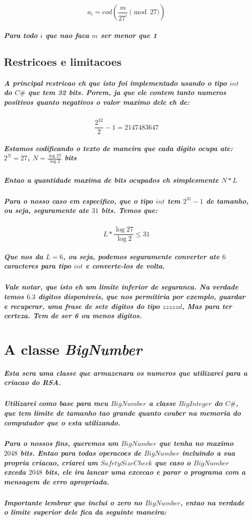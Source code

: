 \documentclass[12pt,twoside, a4paper, twocolumn]{article}
\begin{document}
\begin{equation}
    a_i    = cod\left(\frac{m}{27^i} \pmod{27}\right)
\end{equation}

\subparagraph*{Para todo $i$ que nao faca $m$ ser menor que 1}

\subsection{Restricoes e limitacoes}

\subparagraph*{A principal restricao eh que isto foi implementado usando o tipo $int$ do $C\#$ que tem 32 bits. Porem, ja que ele contem tanto numeros positivos quanto negativos o valor maximo dele eh de:}

\begin{equation}
    \frac{2^{32}}{2} - 1 = 2147483647
\end{equation}

\subparagraph*{Estamos codificando o texto de maneira que cada digito ocupa ate: $2^N = 27$, $N = \frac{\log{27}}{\log{2}}$ bits}

\subparagraph*{ Entao a quantidade maxima de bits ocupados eh simplesmente $N*L$}

\subparagraph*{Para o nosso caso em especifico, que o tipo $int$ tem $2^{31} -1$ de tamanho, ou seja, seguramente ate $31$ bits. Temos que:}

\begin{equation}
    L * \frac{\log{27}}{\log{2}} \le 31
\end{equation}

\subparagraph*{Que nos da $L = 6$, ou seja, podemos seguramente converter ate $6$ caracteres para tipo $int$ e converte-los de volta.
}

\subparagraph*{Vale notar, que isto eh um limite inferior de seguranca. Na verdade temos $6.3$ digitos disponiveis, que nos permitiria por exemplo, guardar e recuperar, uma frase de sete digitos do tipo $zzzzzd$, Mas para ter certeza. Tem de ser 6 ou menos digitos.}

\section{A classe \emph{BigNumber}}

\subparagraph*{Esta sera uma classe que armazenara os numeros que utilizarei para a criacao do RSA. }
\subparagraph*{Utilizarei como base para meu $BigNumber$ a classe $BigInteger$ do $C\#$, que tem limite de tamanho tao grande quanto couber na memoria do computador que o esta utilizando.}
\subparagraph*{Para o nossos fins, queremos um $BigNumber$ que tenha no maximo $2048$ bits. Entao para todas operacoes de $BigNumber$ incluindo a sua propria criacao, criarei um $SafetySizeCheck$ que caso o $BigNumber$ exceda $2048$ bits, ele ira lancar uma excecao e parar o programa com a mensagem de erro apropriada.}
\subparagraph*{Importante lembrar que inclui o zero no $BigNumber$, entao na verdade o limite superior dele fica da seguinte maneira:}
\end{document}
